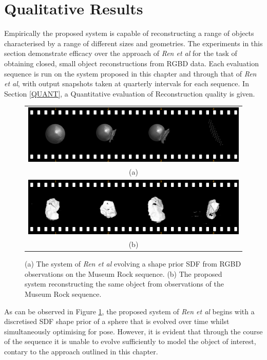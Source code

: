 \section{Qualitative Results}
\label{sec:probobj_qualitative}
Empirically the proposed system is capable of reconstructing a range of objects 
characterised by a range of different sizes and geometries. The experiments in 
this section demonstrate efficacy over the approach of \textit{Ren et al} 
\cite{Ren2013} for the task of obtaining closed, small object reconstructions 
from RGBD data. Each evaluation sequence is run on the system proposed in this 
chapter and through that of \textit{Ren et al}, with output snapshots taken at 
quarterly intervals for each sequence. In Section \ref{QUANT}, a Quantitative 
evaluation of Reconstruction quality is given.

\begin{figure}[h]
  \label{fig:probobj_rock_s3d}
  \centering
  \begin{tabular}{@{}c@{}}
    \includegraphics[width=.6\linewidth]{figures/object_recon/strips/rock_s3d.png} \\
    (a) \\
    \includegraphics[width=.6\linewidth]{figures/object_recon/strips/rock.png} \\ 
    (b)\\
  \end{tabular}
  \caption[Probabilistic Object Reconstruction Qualitative Results I]
  {(a) The system of \textit{Ren et al} \cite{Ren2013} evolving a shape prior SDF 
  from RGBD observations on the Museum Rock sequence. (b) The proposed system reconstructing 
  the same object from observations of the Museum Rock sequence.}
\end{figure}

As can be observed in Figure \ref{fig:probobj_rock_s3d}, the proposed system of 
\textit{Ren et al} begins with a discretised SDF shape prior of a sphere that is 
evolved over time whilst simultaneously optimising for pose. However, it is evident 
that through the course of the sequence it is unable to evolve sufficiently to model 
the object of interest, contary to the approach outlined in this chapter.


